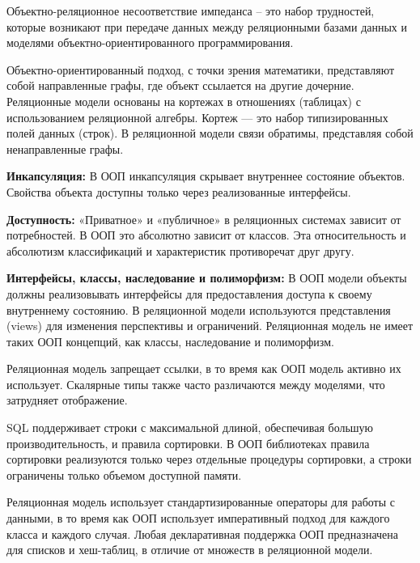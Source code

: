 
    Объектно-реляционное несоответствие импеданса -- это набор трудностей, которые возникают при передаче данных между реляционными базами данных и моделями объектно-ориентированного программирования.


        Объектно-ориентированный подход, с точки зрения математики, представляют собой направленные графы, где объект ссылается на другие дочерние. Реляционные модели основаны на кортежах в отношениях (таблицах) с использованием реляционной алгебры. Кортеж — это набор типизированных полей данных (строк). В реляционной модели связи обратимы, представляя собой ненаправленные графы.


        \textbf{Инкапсуляция:} В ООП инкапсуляция скрывает внутреннее состояние объектов. Свойства объекта доступны только через реализованные интерфейсы.

        \textbf{Доступность:} «Приватное» и «публичное» в реляционных системах зависит от потребностей. В ООП это абсолютно зависит от классов. Эта относительность и абсолютизм классификаций и характеристик противоречат друг другу.

        \textbf{Интерфейсы, классы, наследование и полиморфизм:} В ООП модели объекты должны реализовывать интерфейсы для предоставления доступа к своему внутреннему состоянию. В реляционной модели используются представления (views) для изменения перспективы и ограничений. Реляционная модель не имеет таких ООП концепций, как классы, наследование и полиморфизм.


        Реляционная модель запрещает ссылки, в то время как ООП модель активно их использует. Скалярные типы также часто различаются между моделями, что затрудняет отображение.

        SQL поддерживает строки с максимальной длиной, обеспечивая большую производительность, и правила сортировки. В ООП библиотеках правила сортировки реализуются только через отдельные процедуры сортировки, а строки ограничены только объемом доступной памяти.


        Реляционная модель использует стандартизированные операторы для работы с данными, в то время как ООП использует императивный подход для каждого класса и каждого случая. Любая декларативная поддержка ООП предназначена для списков и хеш-таблиц, в отличие от множеств в реляционной модели.

